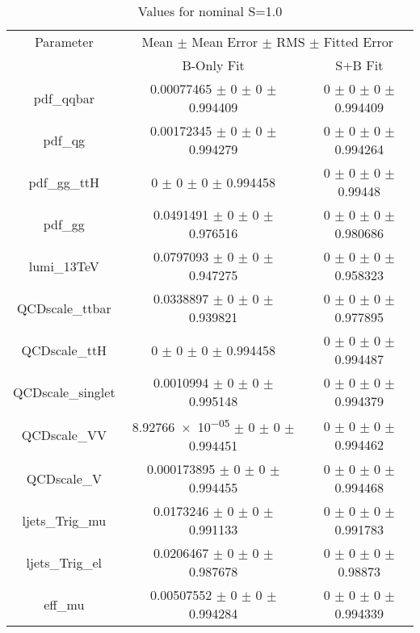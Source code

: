 \begin{table}
\centering
\caption{Values for nominal S=1.0}
\begin{tabular}{ccc}
\toprule
Parameter 	& \multicolumn{2}{c}{Mean $\pm$ Mean Error $\pm$ RMS $\pm$ Fitted Error}\\
 	& B-Only Fit & S+B Fit\\
\midrule
pdf\_qqbar 	& \num{0.00077465} $\pm$ \num{0} $\pm$ \num{0} $\pm$ \num{0.994409} 	& \num{0} $\pm$ \num{0} $\pm$ \num{0} $\pm$ \num{0.994409}\\
pdf\_qg 	& \num{0.00172345} $\pm$ \num{0} $\pm$ \num{0} $\pm$ \num{0.994279} 	& \num{0} $\pm$ \num{0} $\pm$ \num{0} $\pm$ \num{0.994264}\\
pdf\_gg\_ttH 	& \num{0} $\pm$ \num{0} $\pm$ \num{0} $\pm$ \num{0.994458} 	& \num{0} $\pm$ \num{0} $\pm$ \num{0} $\pm$ \num{0.99448}\\
pdf\_gg 	& \num{0.0491491} $\pm$ \num{0} $\pm$ \num{0} $\pm$ \num{0.976516} 	& \num{0} $\pm$ \num{0} $\pm$ \num{0} $\pm$ \num{0.980686}\\
lumi\_13TeV 	& \num{0.0797093} $\pm$ \num{0} $\pm$ \num{0} $\pm$ \num{0.947275} 	& \num{0} $\pm$ \num{0} $\pm$ \num{0} $\pm$ \num{0.958323}\\
QCDscale\_ttbar 	& \num{0.0338897} $\pm$ \num{0} $\pm$ \num{0} $\pm$ \num{0.939821} 	& \num{0} $\pm$ \num{0} $\pm$ \num{0} $\pm$ \num{0.977895}\\
QCDscale\_ttH 	& \num{0} $\pm$ \num{0} $\pm$ \num{0} $\pm$ \num{0.994458} 	& \num{0} $\pm$ \num{0} $\pm$ \num{0} $\pm$ \num{0.994487}\\
QCDscale\_singlet 	& \num{0.0010994} $\pm$ \num{0} $\pm$ \num{0} $\pm$ \num{0.995148} 	& \num{0} $\pm$ \num{0} $\pm$ \num{0} $\pm$ \num{0.994379}\\
QCDscale\_VV 	& \num{8.92766e-05} $\pm$ \num{0} $\pm$ \num{0} $\pm$ \num{0.994451} 	& \num{0} $\pm$ \num{0} $\pm$ \num{0} $\pm$ \num{0.994462}\\
QCDscale\_V 	& \num{0.000173895} $\pm$ \num{0} $\pm$ \num{0} $\pm$ \num{0.994455} 	& \num{0} $\pm$ \num{0} $\pm$ \num{0} $\pm$ \num{0.994468}\\
ljets\_Trig\_mu 	& \num{0.0173246} $\pm$ \num{0} $\pm$ \num{0} $\pm$ \num{0.991133} 	& \num{0} $\pm$ \num{0} $\pm$ \num{0} $\pm$ \num{0.991783}\\
ljets\_Trig\_el 	& \num{0.0206467} $\pm$ \num{0} $\pm$ \num{0} $\pm$ \num{0.987678} 	& \num{0} $\pm$ \num{0} $\pm$ \num{0} $\pm$ \num{0.98873}\\
eff\_mu 	& \num{0.00507552} $\pm$ \num{0} $\pm$ \num{0} $\pm$ \num{0.994284} 	& \num{0} $\pm$ \num{0} $\pm$ \num{0} $\pm$ \num{0.994339}\\

\end{tabular}
\end{table}
